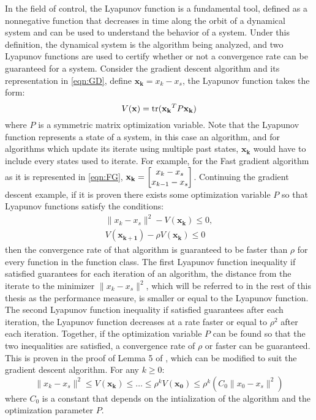 In the field of control, the Lyapunov function is a fundamental tool, defined as a nonnegative function that decreases in time along the orbit of a dynamical system and can be used to understand the behavior of a system. Under this definition, the dynamical system is the algorithm being analyzed, and two Lyapunov functions are used to certify whether or not a convergence rate can be guaranteed for a system. Consider the gradient descent algorithm and its representation in \eqref{eqn:GD}, define $\mathbf{x_k} = x_k - x_s$, the Lyapunov function takes the form:
\begin{equation}
	V(\mathbf{x}) = \operatorname{\mathrm{tr}}(\mathbf{x_k}^TP\mathbf{x_k}) \label{eqn:Lyapunov}
\end{equation}
where $P$ is a symmetric matrix optimization variable. Note that the Lyapunov function represents a state of a system, in this case an algorithm, and for algorithms which update its iterate using multiple past states, $\mathbf{x_k}$ would have to include every states used to iterate. For example, for the Fast gradient algorithm as it is represented in \eqref{eqn:FG}, $\mathbf{x_k} = \begin{bmatrix}x_{k} - x_s \\ x_{k-1} - x_s\end{bmatrix}$. Continuing the gradient descent example, if it is proven there exists some optimization variable $P$ so that Lyapunov functions satisfy the conditions:
\begin{subequations} \label{eqn:Ly_ineq}
	\begin{align}
	  \|x_k - x_s\|^2 - V(\mathbf{x_k}) \leq 0,      \\
	  V(\mathbf{x_{k+1}}) - \rho V(\mathbf{x_k}) \leq 0
	\end{align}
\end{subequations}
then the convergence rate of that algorithm is guaranteed to be faster than $\rho $ for every function in the function class. The first Lyapunov function inequality if satisfied guarantees for each iteration of an algorithm, the distance from the iterate to the minimizer $\|x_k - x_s\|^2$, which will be referred to in the rest of this thesis as the performance measure, is smaller or equal to the Lyapunov function. The second Lyapunov function inequality if satisfied guarantees after each iteration, the Lyapunov function decreases at a rate faster or equal to $\rho^2$ after each iteration. Together, if the optimization variable $P$ can be found so that the two inequalities are satisfied, a convergence rate of $\rho$ or faster can be guaranteed. This is proven in the proof of Lemma 5 of \cite{tutorial}, which can be modified to suit the gradient descent algorithm. For any $k \geq 0$:
\begin{equation}
	\|x_k - x_s\|^2 \leq V(\mathbf{x_{k}}) \leq \ldots \leq \rho^{k}V(\mathbf{x_{0}}) \leq \rho^k(C_0\|x_0 - x_s\|^2)
\end{equation}
where $C_0$ is a constant that depends on the intialization of the algorithm and the optimization parameter $P$.

